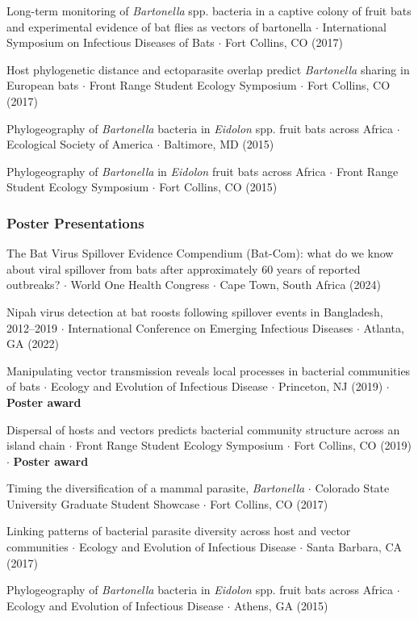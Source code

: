 \documentclass{cv}
\begin{document}
Long-term monitoring of \textit{Bartonella} spp. bacteria in a captive colony of fruit bats and experimental evidence of bat flies as vectors of bartonella $\cdot$ International Symposium on Infectious Diseases of Bats $\cdot$ Fort Collins, CO (2017)

Host phylogenetic distance and ectoparasite overlap predict \textit{Bartonella} sharing in European bats $\cdot$ Front Range Student Ecology Symposium $\cdot$ Fort Collins, CO (2017)

Phylogeography of \textit{Bartonella} bacteria in \textit{Eidolon} spp. fruit bats across Africa $\cdot$ Ecological Society of America $\cdot$ Baltimore, MD (2015)

Phylogeography of \textit{Bartonella} in \textit{Eidolon} fruit bats across Africa $\cdot$ Front Range Student Ecology Symposium $\cdot$ Fort Collins, CO (2015)

\subsubsection*{Poster Presentations}

The Bat Virus Spillover Evidence Compendium (Bat-Com): what do we know about viral spillover from bats after approximately 60 years of reported outbreaks? $\cdot$ World One Health Congress $\cdot$ Cape Town, South Africa (2024)

Nipah virus detection at bat roosts following spillover events in Bangladesh, 2012--2019 $\cdot$ International Conference on Emerging Infectious Diseases $\cdot$ Atlanta, GA (2022)

Manipulating vector transmission reveals local processes in bacterial communities of bats $\cdot$ Ecology and Evolution of Infectious Disease $\cdot$ Princeton, NJ (2019) $\cdot$ \textbf{Poster award}

Dispersal of hosts and vectors predicts bacterial community structure across an island chain $\cdot$ Front Range Student Ecology Symposium $\cdot$ Fort Collins, CO (2019) $\cdot$ \textbf{Poster award}

Timing the diversification of a mammal parasite, \textit{Bartonella} $\cdot$ Colorado State University Graduate Student Showcase $\cdot$ Fort Collins, CO (2017)

Linking patterns of bacterial parasite diversity across host and vector communities $\cdot$ Ecology and Evolution of Infectious Disease $\cdot$ Santa Barbara, CA (2017)

Phylogeography of \textit{Bartonella} bacteria in \textit{Eidolon} spp. fruit bats across Africa $\cdot$ Ecology and Evolution of Infectious Disease $\cdot$ Athens, GA (2015)
\end{document}
